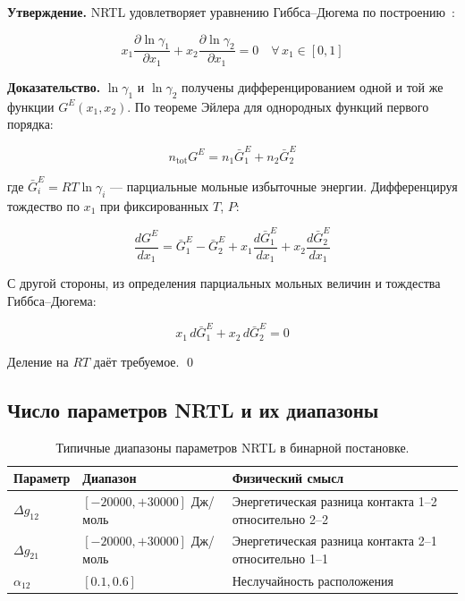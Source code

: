 \documentclass[11pt]{article}
\begin{document}
\textbf{Утверждение.} NRTL удовлетворяет уравнению Гиббса--Дюгема по построению~\cite{prausnitz1998}:

\begin{equation*}
x_1 \frac{\partial \ln \gamma_1}{\partial x_1} + x_2 \frac{\partial \ln \gamma_2}{\partial x_1} = 0 \quad \forall \, x_1 \in [0, 1]
\end{equation*}

\textbf{Доказательство.} $\ln \gamma_1$ и $\ln \gamma_2$ получены дифференцированием одной и той же функции $G^E(x_1, x_2)$. По теореме Эйлера для однородных функций первого порядка:

\begin{equation*}
n_{\mathrm{tot}} G^E = n_1 \bar{G}_1^E + n_2 \bar{G}_2^E
\end{equation*}

где $\bar{G}_i^E = RT \ln \gamma_i$ --- парциальные мольные избыточные энергии. Дифференцируя тождество по $x_1$ при фиксированных $T$, $P$:

\begin{equation*}
\frac{dG^E}{dx_1} = \bar{G}_1^E - \bar{G}_2^E + x_1 \frac{d\bar{G}_1^E}{dx_1} + x_2 \frac{d\bar{G}_2^E}{dx_1}
\end{equation*}

С другой стороны, из определения парциальных мольных величин и тождества Гиббса--Дюгема:

\begin{equation*}
x_1 \, d\bar{G}_1^E + x_2 \, d\bar{G}_2^E = 0
\end{equation*}

Деление на $RT$ даёт требуемое. \qed

\subsection{Число параметров NRTL и их диапазоны}

\begin{table}[H]
\centering
\begin{tabularx}{0.99\textwidth}{|P{1.9cm}|P{3.1cm}|Y|}
\hline
Параметр & Диапазон & Физический смысл \\
\hline
$\Delta g_{12}$ & $[-20000, +30000]$ Дж/моль & Энергетическая разница контакта 1--2 относительно 2--2 \\
\hline
$\Delta g_{21}$ & $[-20000, +30000]$ Дж/моль & Энергетическая разница контакта 2--1 относительно 1--1 \\
\hline
$\alpha_{12}$ & $[0.1, 0.6]$ & Неслучайность расположения \\
\hline
\end{tabularx}
\caption{Типичные диапазоны параметров NRTL в бинарной постановке.}
\end{table}
\end{document}

